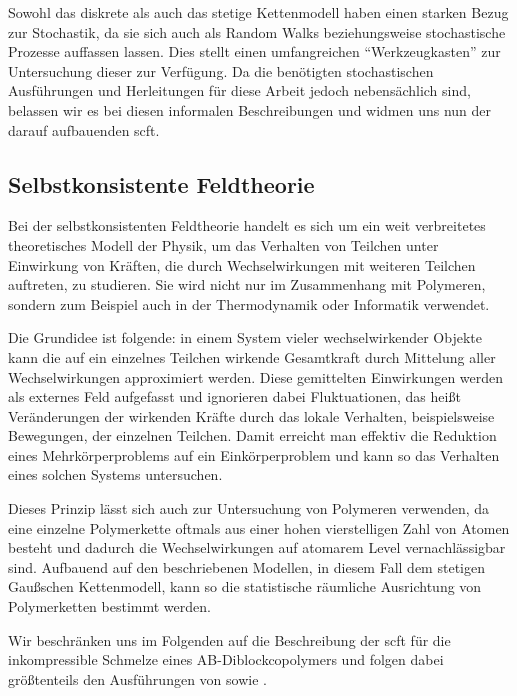 \documentclass[../main.tex]{subfiles}
\begin{document}
Sowohl das diskrete als auch das stetige Kettenmodell haben einen starken Bezug zur Stochastik, da sie sich auch als Random Walks beziehungsweise stochastische Prozesse auffassen lassen.
Dies stellt einen umfangreichen \enquote{Werkzeugkasten} zur Untersuchung dieser zur Verfügung.
Da die benötigten stochastischen Ausführungen und Herleitungen für diese Arbeit jedoch nebensächlich sind, belassen wir es bei diesen informalen Beschreibungen und widmen uns nun der darauf aufbauenden \ac{scft}.


\subsection*{Selbstkonsistente Feldtheorie} %

Bei der selbstkonsistenten Feldtheorie handelt es sich um ein weit verbreitetes theoretisches Modell der Physik, um das Verhalten von Teilchen unter Einwirkung von Kräften, die durch Wechselwirkungen mit weiteren Teilchen auftreten, zu studieren.
Sie wird nicht nur im Zusammenhang mit Polymeren, sondern zum Beispiel auch in der Thermodynamik oder Informatik verwendet.

Die Grundidee ist folgende: in einem System vieler wechselwirkender Objekte kann die auf ein einzelnes Teilchen wirkende Gesamtkraft durch Mittelung aller Wechselwirkungen approximiert werden.
Diese gemittelten Einwirkungen werden als externes Feld aufgefasst und ignorieren dabei Fluktuationen, das heißt Veränderungen der wirkenden Kräfte durch das lokale Verhalten, beispielsweise Bewegungen, der einzelnen Teilchen.
Damit erreicht man effektiv die Reduktion eines Mehrkörperproblems auf ein Einkörperproblem und kann so das Verhalten eines solchen Systems untersuchen.

Dieses Prinzip lässt sich auch zur Untersuchung von Polymeren verwenden, da eine einzelne Polymerkette oftmals aus einer hohen vierstelligen Zahl von Atomen besteht und dadurch die Wechselwirkungen auf atomarem Level vernachlässigbar sind.
Aufbauend auf den beschriebenen Modellen, in diesem Fall dem stetigen Gaußschen Kettenmodell, kann so die statistische räumliche Ausrichtung von Polymerketten bestimmt werden.

Wir beschränken uns im Folgenden auf die Beschreibung der \ac{scft} für die inkompressible Schmelze eines AB-Diblockcopolymers und folgen dabei größtenteils den Ausführungen von \textcite{Matsen:1994bz} sowie \textcite{Stasiak:2011ba}.
\end{document}
